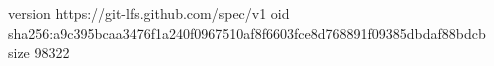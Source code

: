 version https://git-lfs.github.com/spec/v1
oid sha256:a9c395bcaa3476f1a240f0967510af8f6603fce8d768891f09385dbdaf88bdcb
size 98322
